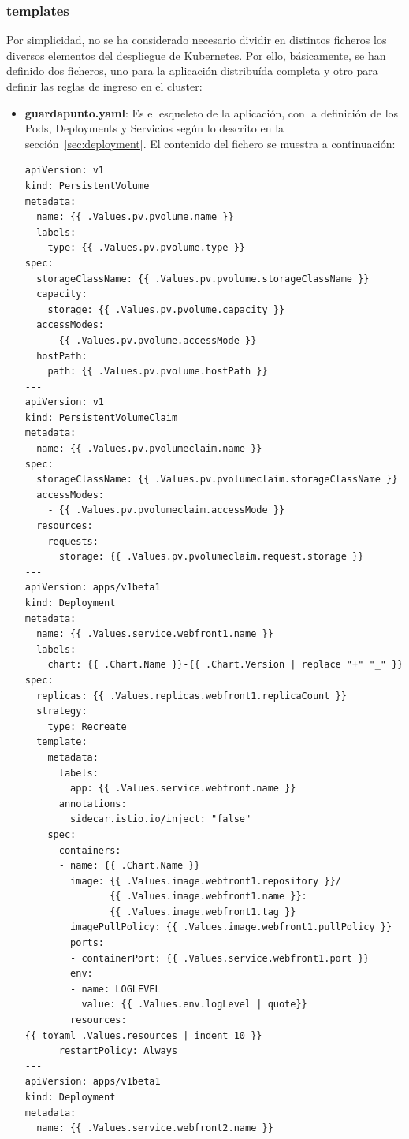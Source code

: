 \documentclass[12pt,spanish]{article}
\begin{document}
\subsubsection{templates}
Por simplicidad, no se ha considerado necesario dividir en distintos ficheros los diversos elementos del despliegue de Kubernetes. Por ello, básicamente, se han definido dos ficheros, uno para la aplicación distribuída completa y otro para definir las reglas de ingreso en el cluster:
\begin{itemize}
\item{\textbf{guardapunto.yaml}}: Es el esqueleto de la aplicación, con la definición de los Pods, Deployments y Servicios según lo descrito en la sección~\ref{sec:deployment}. El contenido del fichero se muestra a continuación:
\begin{verbatim}
apiVersion: v1
kind: PersistentVolume
metadata:
  name: {{ .Values.pv.pvolume.name }}
  labels:
    type: {{ .Values.pv.pvolume.type }}
spec:
  storageClassName: {{ .Values.pv.pvolume.storageClassName }}
  capacity:
    storage: {{ .Values.pv.pvolume.capacity }}
  accessModes:
    - {{ .Values.pv.pvolume.accessMode }}
  hostPath:
    path: {{ .Values.pv.pvolume.hostPath }}
---
apiVersion: v1
kind: PersistentVolumeClaim
metadata:
  name: {{ .Values.pv.pvolumeclaim.name }}
spec:
  storageClassName: {{ .Values.pv.pvolumeclaim.storageClassName }}
  accessModes:
    - {{ .Values.pv.pvolumeclaim.accessMode }}
  resources:
    requests:
      storage: {{ .Values.pv.pvolumeclaim.request.storage }}
---
apiVersion: apps/v1beta1
kind: Deployment
metadata:
  name: {{ .Values.service.webfront1.name }}
  labels:
    chart: {{ .Chart.Name }}-{{ .Chart.Version | replace "+" "_" }}
spec:
  replicas: {{ .Values.replicas.webfront1.replicaCount }}
  strategy:
    type: Recreate
  template:
    metadata:
      labels:
        app: {{ .Values.service.webfront.name }}
      annotations:
        sidecar.istio.io/inject: "false"
    spec:
      containers:
      - name: {{ .Chart.Name }}
        image: {{ .Values.image.webfront1.repository }}/
               {{ .Values.image.webfront1.name }}:
               {{ .Values.image.webfront1.tag }}
        imagePullPolicy: {{ .Values.image.webfront1.pullPolicy }}
        ports:
        - containerPort: {{ .Values.service.webfront1.port }}
        env:
        - name: LOGLEVEL
          value: {{ .Values.env.logLevel | quote}}
        resources:
{{ toYaml .Values.resources | indent 10 }}
      restartPolicy: Always
---
apiVersion: apps/v1beta1
kind: Deployment
metadata:
  name: {{ .Values.service.webfront2.name }}

\end{verbatim}
\end{itemize}
\end{document}
